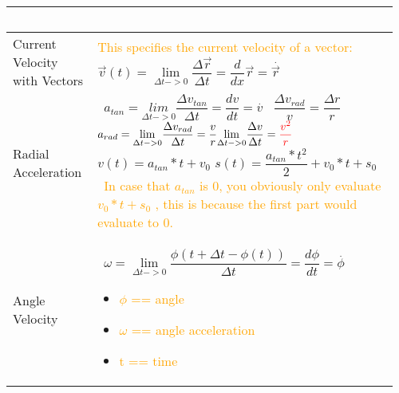 \documentclass[main.tex,fontsize=8pt,paper=a4,paper=portrait,DIV=calc,]{scrartcl}
\begin{document}
\begin{table}[ht!]
\begin{tabular}{|m{0.2\linewidth}|m{0.755\linewidth}|}
\, \newline \normalsize \\
\hline
Current Velocity with Vectors & 
\textcolor{orange}{This specifies the current velocity of a vector:}\newline
\, \newline
\huge \( \vec{v}(t) = \underset{\Delta t -> 0}{\lim} \dfrac{\Delta \vec{r}}{\Delta t} = \dfrac{d}{dx} \vec{r} = \overset{.}{\vec{r}} \) \newline 
\, \newline \normalsize \\
\hline
Radial Acceleration & 
\, \newline
\huge \( a_{tan} = \underset{\Delta t -> 0}{lim} \dfrac{\Delta v_{tan}}{\Delta t} = \dfrac{dv}{dt} = \overset{.}{v} \) \newline
\, \newline
\huge \( \dfrac{\Delta v_{rad}}{v} = \dfrac{\Delta r}{r}\)
\, \newline
\huge \( a_{rad} = \underset{\Delta t -> 0}{\lim} \dfrac{\Delta v_{rad}}{\Delta t} = \dfrac{v}{r}\underset{\Delta t -> 0}{\lim} \dfrac{\Delta v}{\Delta t} = \textcolor{red}{\dfrac{v^2}{r}} \) \newline
\, \newline
\huge \( v(t) = a_{tan} * t + v_0 \) \newline
\huge \( s(t) = \dfrac{a_{tan} * t^2}{2} + v_0 * t + s_0\) \newline
\, \newline \normalsize \
\textcolor{orange}{In case that \(a_{tan}\) is 0, you obviously only evaluate \(v_0 * t + s_0\) , this is because the first part would evaluate to 0.}
\\
\hline
Angle Velocity & 
\, \newline
\huge \( \omega = \underset{\Delta t -> 0}{\lim} \dfrac{\phi(t + \Delta t - \phi(t))}{\Delta t} = \dfrac{d\phi}{dt} = \overset{.}{\phi} \) \newline
\, \newline \normalsize
\begin{itemize}
\item \textcolor{orange}{\(\phi\) == angle}
\item \textcolor{orange}{\(\omega\) == angle acceleration}
\item \textcolor{orange}{ t == time}
\vspace{-3mm}
\end{itemize}
\\ 
\hline
\end{tabular}
\end{table}
\end{document}
